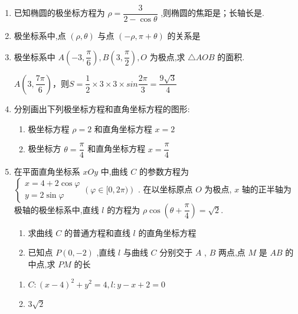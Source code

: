 \begin{enumerate}
    \item 已知椭圆的极坐标方程为 $\rho  = \dfrac{3}{2 - \cos \theta }$ ,则椭圆的焦距是；长轴长是.

    \item 极坐标系中,点 $\left( {\rho ,\theta }\right)$ 与点 $\left( {-\rho ,\pi  + \theta }\right)$ 的关系是
    
    \item 极坐标系中 $A\left( {-3,\dfrac{\pi }{6}}\right) ,B\left( {3,\dfrac{\pi }{2}}\right) ,{O}$ 为极点,求 $\bigtriangleup {AOB}$ 的面积.
    \begin{jieda}
        $A\left(3, \dfrac{7\pi}{6}\right)$，则$S = \dfrac{1}{2} \times 3 \times 3 \times sin\dfrac{2\pi}{3} = \dfrac{9\sqrt{3}}{4}$
    \end{jieda}

    \item 分别画出下列极坐标方程和直角坐标方程的图形:
    \begin{enumerate}
        \item 极坐标方程 $\rho  = 2$ 和直角坐标方程 $x = 2$
        \item 极坐标方 $\theta  = \dfrac{\pi }{4}$ 和直角坐标方程 $x = \dfrac{\pi }{4}$
    \end{enumerate}
    
    \item 在平面直角坐标系 ${xOy}$ 中,曲线 $C$ 的参数方程为 $\left\{  {\begin{array}{l} x = 4 + 2\cos \varphi \\  y = 2\sin \varphi  \end{array}\left( {\varphi  \in  \lbrack 0,{2\pi })}\right) }\right.$ . 在以坐标原点 $O$ 为极点, $x$ 轴的正半轴为极轴的极坐标系中,直线 $l$ 的方程为 $\rho \cos \left( {\theta  + \dfrac{\pi }{4}}\right)  = \sqrt{2}.$
    \begin{enumerate}
        \item 求曲线 $C$ 的普通方程和直线 $l$ 的直角坐标方程
        \item 已知点 $P\left( {0, - 2}\right)$ ,直线 $l$ 与曲线 $C$ 分别交于 $A$ , $B$ 两点,点 $M$ 是 ${AB}$ 的中点,求 ${PM}$ 的长
    \end{enumerate}
    \begin{jieda}
        \begin{enumerate}
            \item $C : {\left( x - 4\right) }^{2} + {y}^{2} = 4,l : y - x + 2 = 0$
            \item $3\sqrt{2}$
        \end{enumerate}
    \end{jieda}
    
\end{enumerate}